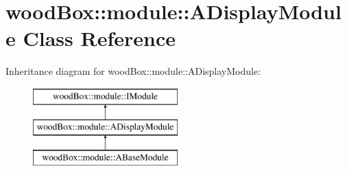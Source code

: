 \hypertarget{classwood_box_1_1module_1_1_a_display_module}{}\section{wood\+Box\+:\+:module\+:\+:A\+Display\+Module Class Reference}
\label{classwood_box_1_1module_1_1_a_display_module}
Inheritance diagram for wood\+Box\+:\+:module\+:\+:A\+Display\+Module\+:\begin{figure}[H]
\begin{center}
\leavevmode
\includegraphics[height=3.000000cm]{classwood_box_1_1module_1_1_a_display_module}
\end{center}
\end{figure}
